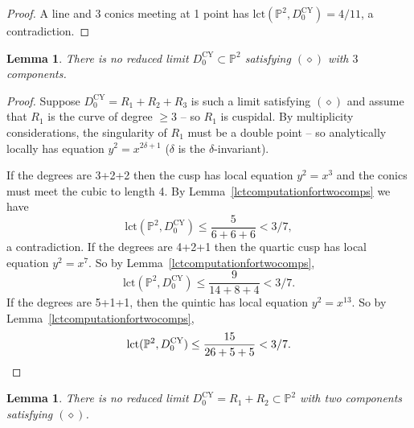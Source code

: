 \documentclass[JEP,XML,SOM,Unicode,NoFloatCountersInSection,published]{cedram}
\theoremstyle{plain}
\newtheorem{lemma}[theorem]{Lemma}
\theoremstyle{definition}
\newcommand\PP{{\mathbb{P}}}
\newcommand\lct{\mathrm{lct}}
\newcommand\Dcyo{{D^{\mathrm{CY}}_0}}
\begin{document}
\begin{proof}
A line and 3 conics meeting at 1 point has $\lct(\PP^2,\Dcyo)=4/11$, a contradiction.
\end{proof}

\begin{lemma}\label{threeredcoms}
There is no reduced limit $\Dcyo\subset \PP^2$ satisfying $(\diamond)$ with $3$ components.
\end{lemma}

\begin{proof}
Suppose $\Dcyo=R_1+R_2+R_3$ is such a limit satisfying $(\diamond)$ and assume that $R_1$ is the curve of degree $\ge 3$ -- so $R_1$ is cuspidal. By multiplicity considerations, the singularity of $R_1$ must be a double point -- so analytically locally has equation $y^2=x^{2\delta+1}$ ($\delta$ is the $\delta$-invariant).

If the degrees are 3+2+2 then the cusp has local equation $y^2=x^3$ and the conics must meet the cubic to length 4. By Lemma~\ref{lctcomputationfortwocomps} we have
\[
\lct(\PP^2,\Dcyo)\le \frac{5}{6+6+6}<3/7,
\]
a contradiction. If the degrees are 4+2+1 then the quartic cusp has local equation $y^2=x^7$. So by Lemma~\ref{lctcomputationfortwocomps},
\[
\lct(\PP^2,\Dcyo)\le \frac{9}{14+8+4}<3/7.
\]
If the degrees are 5+1+1, then the quintic has local equation $y^2=x^{13}$. So by Lemma~\ref{lctcomputationfortwocomps},
\[
\lct(\PP^2,\Dcyo)\le \frac{15}{26+5+5}< 3/7.\qedhere
\]
\end{proof}

\begin{lemma}\label{tworedcoms}
There is no reduced limit $\Dcyo=R_1+R_2\subset \PP^2$ with two components satisfying $(\diamond)$.
\end{lemma}
\end{document}
